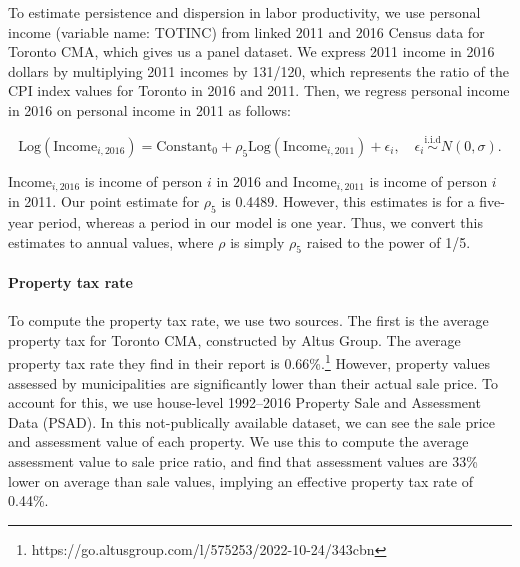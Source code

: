 \documentclass[parskip=full]{article}
\begin{document}
To estimate persistence and dispersion in labor productivity, we use personal income (variable name: TOTINC) from linked 2011 and 2016 Census data for Toronto CMA, which gives us a panel dataset. We express 2011 income in 2016 dollars by multiplying 2011 incomes by 131/120, which represents the ratio of the CPI index values for Toronto in 2016 and 2011. Then, we regress personal income in 2016 on personal income in 2011 as follows:

\begin{equation*}
  \mbox{Log} \left(\mbox{Income}_{i,\mbox{2016}}\right) = \mbox{Constant}_{0}+\rho_{5} \mbox{Log} \left(\mbox{Income}_{i,\mbox{2011}}\right) + \epsilon_{i},\quad \epsilon_{i}\overset{\mathrm{i.i.d}}\sim N(0,\sigma).
\end{equation*}

\noindent $\mbox{Income}_{i,\mbox{2016}}$ is income of person $i$ in 2016 and $\mbox{Income}_{i,\mbox{2011}}$ is income of person $i$ in 2011. Our point estimate for $\rho_{5}$ is 0.4489. However, this estimates is for a five-year period, whereas a period in our model is one year. Thus, we convert this estimates to annual values, where $\rho$ is simply $\rho_{5}$ raised to the power of 1/5.

\paragraph{Property tax rate}

To compute the property tax rate, we use two sources. The first is the average property tax for Toronto CMA, constructed by Altus Group. The average property tax rate they find in their report is 0.66\%.\footnote{https://go.altusgroup.com/l/575253/2022-10-24/343cbn} However, property values assessed by municipalities are significantly lower than their actual sale price. To account for this, we use house-level 1992--2016 Property Sale and Assessment Data (PSAD). In this not-publically available dataset, we can see the sale price and assessment value of each property. We use this to compute the average assessment value to sale price ratio, and find that assessment values are 33\% lower on average than sale values, implying an effective property tax rate of 0.44\%.

\end{document}
